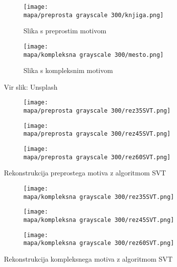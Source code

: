 \renewcommand{\mapa}{Poglavja/Slike/kompleksnost}

\begin{figure}
    \begin{subfigure}{0.5\linewidth}
        \texttt{[image: \\mapa/preprosta grayscale 300/knjiga.png]}
        \caption{Slika s preprostim motivom}
    \end{subfigure}
    \hfill
    \begin{subfigure}{0.5\linewidth}
        \texttt{[image: \\mapa/kompleksna grayscale 300/mesto.png]}
        \caption{Slika s kompleksnim motivom}
    \end{subfigure}
    \caption{Vir slik: Unsplash}
\end{figure}

\begin{figure}
    \begin{subfigure}{0.325\linewidth}
        \texttt{[image: \\mapa/preprosta grayscale 300/rez35SVT.png]}
    \end{subfigure}
    \hfill
    \begin{subfigure}{0.325\linewidth}
        \texttt{[image: \\mapa/preprosta grayscale 300/rez45SVT.png]}
    \end{subfigure}
    \hfill
    \begin{subfigure}{0.325\linewidth}
        \texttt{[image: \\mapa/preprosta grayscale 300/rez60SVT.png]}
    \end{subfigure}
    \caption{Rekonstrukcija preprostega motiva z algoritmom SVT}
\end{figure}
    
\begin{figure}
    \begin{subfigure}{0.325\linewidth}
        \texttt{[image: \\mapa/kompleksna grayscale 300/rez35SVT.png]}
    \end{subfigure}
    \hfill
    \begin{subfigure}{0.325\linewidth}
        \texttt{[image: \\mapa/kompleksna grayscale 300/rez45SVT.png]}
    \end{subfigure}
    \hfill
    \begin{subfigure}{0.325\linewidth}
        \texttt{[image: \\mapa/kompleksna grayscale 300/rez60SVT.png]}
    \end{subfigure}
    \caption{Rekonstrukcija kompleksnega motiva z algoritmom SVT}
\end{figure}

